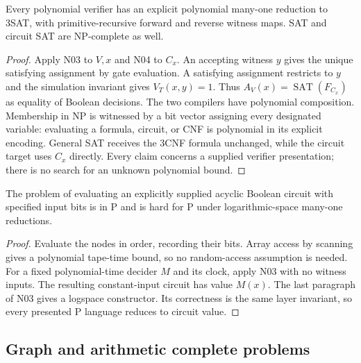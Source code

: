 \begin{theorem}\label{thm:N05}
Every polynomial verifier has an explicit polynomial many-one reduction to
3SAT, with primitive-recursive forward and reverse witness maps. SAT and
circuit SAT are NP-complete as well.
\end{theorem}
\begin{proof}
Apply N03 to $V,x$ and N04 to $C_x$. An accepting witness $y$ gives the unique
satisfying assignment by gate evaluation. A satisfying assignment restricts
to $y$ and the simulation invariant gives $V_T(x,y)=1$. Thus
$A_V(x)=\operatorname{SAT}(F_{C_x})$ as equality of Boolean decisions.
The two compilers have polynomial composition. Membership in NP is witnessed
by a bit vector assigning every designated variable: evaluating a formula,
circuit, or CNF is polynomial in its explicit encoding. General SAT receives
the 3CNF formula unchanged, while the circuit target uses $C_x$ directly.
Every claim concerns a supplied verifier presentation; there is no search for
an unknown polynomial bound.
\end{proof}

\begin{theorem}\label{thm:N06}
The problem of evaluating an explicitly supplied acyclic Boolean circuit with
specified input bits is in P and is hard for P under logarithmic-space
many-one reductions.
\end{theorem}
\begin{proof}
Evaluate the nodes in order, recording their bits. Array access by scanning
gives a polynomial tape-time bound, so no random-access assumption is needed.
For a fixed polynomial-time decider $M$ and its clock, apply N03 with no
witness inputs. The resulting constant-input circuit has value $M(x)$. The
last paragraph of N03 gives a logspace constructor. Its correctness is the
same layer invariant, so every presented P language reduces to circuit value.
\end{proof}

\subsection{Graph and arithmetic complete problems}

